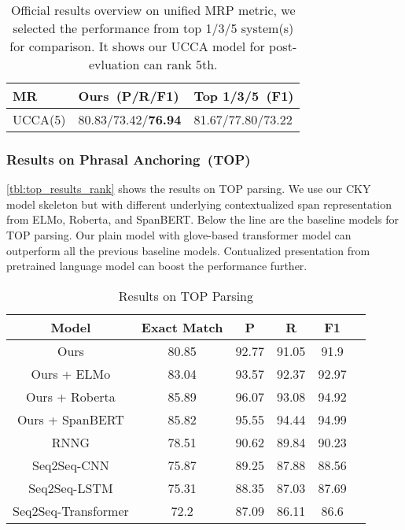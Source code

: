 \begin{table}[!tbp]
\caption{\label{tbl:ucca_results_rank} Official results overview on
  unified MRP metric, we selected the performance from top 1/3/5
  system(s) for comparison. It shows our UCCA model for post-evluation
  can rank 5th.}
  \small
\centering
\begin{tabular}{lll}
\toprule
MR     & Ours~(P/R/F1) & Top 1/3/5~(F1)  \\ \hline
UCCA(5)   & 80.83/73.42/\textbf{76.94}   & 81.67/77.80/73.22 \\
\bottomrule
\end{tabular}
\end{table}


\subsubsection{Results on Phrasal Anchoring~(TOP)}
\label{sssec:lex-phr:top-results}
\autoref{tbl:top_results_rank} shows the results on TOP parsing. We
use our CKY model skeleton but with different underlying
contextualized span representation from ELMo, Roberta, and
SpanBERT. Below the line are the baseline models for TOP parsing. Our
plain model with glove-based transformer model can outperform all the
previous baseline models. Contualized presentation from pretrained
language model can boost the performance further.

\begin{table}[!tbp]
\caption{\label{tbl:top_results_rank} Results on TOP Parsing}
  \small
\centering
\begin{tabular}{cccccc}
  \toprule
  Model           & Exact Match & P     & R     & F1    \\ \hline
  Ours            & 80.85       & 92.77 & 91.05 & 91.9  \\
  Ours + ELMo     & 83.04       & 93.57 & 92.37 & 92.97 \\
  Ours + Roberta  & 85.89       & 96.07 & 93.08 & 94.92 \\
  Ours + SpanBERT & 85.82       & 95.55 & 94.44 & 94.99 \\ \hline
  RNNG                & 78.51       & 90.62 & 89.84 & 90.23 \\
  Seq2Seq-CNN         & 75.87       & 89.25 & 87.88 & 88.56 \\
  Seq2Seq-LSTM        & 75.31       & 88.35 & 87.03 & 87.69 \\
  Seq2Seq-Transformer & 72.2        & 87.09 & 86.11 & 86.6  \\
  \bottomrule
\end{tabular}
\end{table}

